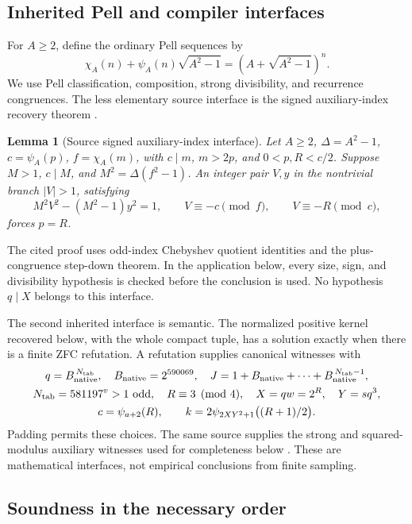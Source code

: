\documentclass[11pt,a4paper]{article}
\newtheorem{lemma}[theorem]{Lemma}
\theoremstyle{definition}
\begin{document}
\subsection{Inherited Pell and compiler interfaces}

For \(A\ge2\), define the ordinary Pell sequences by
\[
 \chi_A(n)+\psi_A(n)\sqrt{A^2-1}
             =(A+\sqrt{A^2-1})^n .
\]
We use Pell classification, composition, strong divisibility, and
recurrence congruences. The less elementary source interface is
the signed auxiliary-index recovery theorem
\cite{p14,p13old,signed}.

\begin{lemma}[Source signed auxiliary-index interface]
\label{lem:auxiliary}
Let \(A\ge2\), \(\Delta=A^2-1\),
\(c=\psi_A(p)\), \(f=\chi_A(m)\), with \(c\mid m\), \(m>2p\),
and \(0<p,R<c/2\). Suppose \(M>1\), \(c\mid M\), and
\(M^2=\Delta(f^2-1)\). An integer pair \(V,y\) in the nontrivial
branch \(|V|>1\), satisfying
\[
 M^2V^2-(M^2-1)y^2=1,\qquad
 V\equiv-c\pmod f,\qquad V\equiv-R\pmod c,
\]
forces \(p=R\).
\end{lemma}

The cited proof uses odd-index Chebyshev quotient identities and
the plus-congruence step-down theorem. In the application below,
every size, sign, and divisibility hypothesis is checked before
the conclusion is used. No hypothesis \(q\mid X\) belongs to
this interface.

The second inherited interface is semantic. The normalized
positive kernel recovered below, with the whole compact tuple,
has a solution exactly when there is a finite ZFC refutation.
A refutation supplies canonical witnesses with
\begin{gather}
 q=B_{\rm native}^{\,N_{\rm tab}},\quad
 B_{\rm native}=2^{590069},\quad
 J=1+B_{\rm native}+\cdots+B_{\rm native}^{\,N_{\rm tab}-1},
 \notag\\
 N_{\rm tab}=581197^v>1\text{ odd},\quad R\equiv3\pmod4,
 \quad X=qw=2^R,\quad Y=sq^3, \notag\\
 c=\psi_{a+2}(R),\qquad
 k=2\psi_{2XY^2+1}\bigl((R+1)/2\bigr).           \label{eq:canonical}
\end{gather}
Padding permits these choices. The same source supplies the
strong and squared-modulus auxiliary witnesses used for
completeness below \cite{p14,compact}. These are mathematical
interfaces, not empirical conclusions from finite sampling.

\subsection{Soundness in the necessary order}
\end{document}
